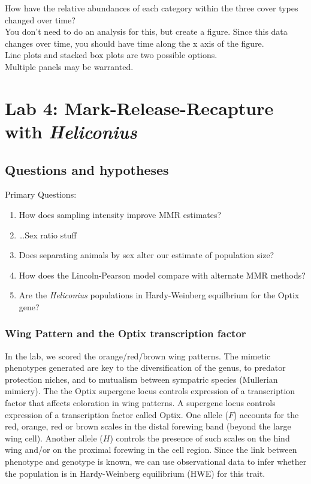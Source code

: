 \documentclass[]{book}
\providecommand{\tightlist}{%
  \setlength{\itemsep}{0pt}\setlength{\parskip}{0pt}}
\begin{document}
How have the relative abundances of each category within the three cover
types changed over time?\\
You don't need to do an analysis for this, but create a figure. Since
this data changes over time, you should have time along the x axis of
the figure.\\
Line plots and stacked box plots are two possible options.\\
Multiple panels may be warranted.

\chapter{\texorpdfstring{Lab 4: Mark-Release-Recapture with
\emph{Heliconius}}{Lab 4: Mark-Release-Recapture with Heliconius}}\label{Lab4}

\section{Questions and hypotheses}\label{questions-and-hypotheses-1}

Primary Questions:

\begin{enumerate}
\def\labelenumi{\arabic{enumi}.}
\tightlist
\item
  How does sampling intensity improve MMR estimates?
\item
  \ldots{}Sex ratio stuff
\item
  Does separating animals by sex alter our estimate of population size?
\item
  How does the Lincoln-Pearson model compare with alternate MMR methods?
\item
  Are the \emph{Heliconius} populations in Hardy-Weinberg equilbrium for
  the Optix gene?
\end{enumerate}

\subsection{Wing Pattern and the Optix transcription
factor}\label{wing-pattern-and-the-optix-transcription-factor}

In the lab, we scored the orange/red/brown wing patterns. The mimetic
phenotypes generated are key to the diversification of the genus, to
predator protection niches, and to mutualism between sympatric species
(Mullerian mimicry). The the Optix supergene locus controls expression
of a transcription factor that affects coloration in wing patterns. A
supergene locus controls expression of a transcription factor called
Optix. One allele (\(F\)) accounts for the red, orange, red or brown
scales in the distal forewing band (beyond the large wing cell). Another
allele (\(H\)) controls the presence of such scales on the hind wing
and/or on the proximal forewing in the cell region. Since the link
between phenotype and genotype is known, we can use observational data
to infer whether the population is in Hardy-Weinberg equilibrium (HWE)
for this trait.
\end{document}
